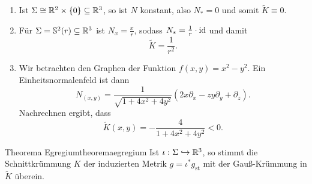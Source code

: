 \begin{beispiele}
\begin{enumerate}
\item Ist $\Sigma \cong \mathbb{R}^2 \times \{0\} \subseteq \mathbb{R}^3$, so ist $N$ konstant, also $N_\ast = 0$ und somit $\tilde{K}\equiv 0$.
\item Für $\Sigma = \mathbb{S}^2(r) \subseteq \mathbb{R}^3$ ist $N_x=\frac{x}{r}$, sodass $N_\ast = \frac{1}{r} \cdot \text{id}$ und damit 
\begin{equation}
\tilde{K} = \frac{1}{r^2}.
\end{equation}
\item Wir betrachten den Graphen der Funktion $f(x,y)=x^2-y^2$. Ein Einheitsnormalenfeld ist dann
\begin{equation}
N_{(x,y)}=\frac{1}{\sqrt{1+4x^2+4y^2}} (2x \partial_x - zy\partial_y+\partial_z).
\end{equation}
Nachrechnen ergibt, dass
\begin{equation}
\tilde{K}(x,y)=- \frac{4}{1+4x^2+4y^2} < 0.
\end{equation}
\end{enumerate}
\end{beispiele}
\begin{theorem}{Theorema Egregium}{theoremaegregium}
Ist $\iota: \Sigma \hookrightarrow \mathbb{R}^3$, so stimmt die Schnittkrümmung $K$ der induzierten Metrik $g=\iota^\ast g_\text{st}$ mit der Gauß-Krümmung in $\tilde{K}$ überein.
\end{theorem}
